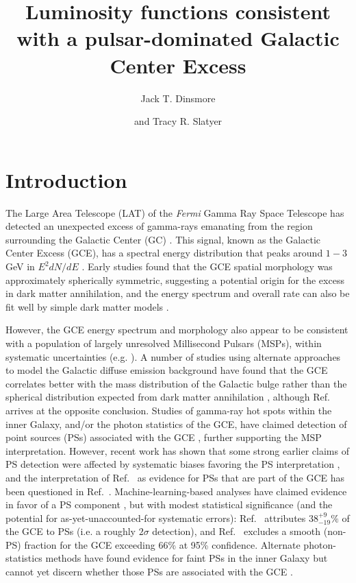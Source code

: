 \documentclass[letter,11pt]{article}
\title{Luminosity functions consistent with a pulsar-dominated Galactic Center Excess}
\author{Jack T. Dinsmore}
\author{and Tracy R. Slatyer}
\affiliation{Center for Theoretical Physics, Massachusetts Institute of Technology, Cambridge, MA 02139, USA}
\begin{document}
\maketitle
\flushbottom

\section{Introduction}

 The Large Area Telescope (LAT) of the \textit{Fermi} Gamma Ray Space Telescope has detected an unexpected excess of gamma-rays emanating from the region surrounding the Galactic Center (GC) \cite{Goodenough:2009gk, HOOPER2011412, Gordon:2013vta}. This signal, known as the Galactic Center Excess (GCE), has a spectral energy distribution that peaks around $1-3$ GeV in $E^2 dN/dE$ 
 \cite{DiMauro:2021raz, Calore:2014xka, Zhong:2019ycb, Gordon13, Ajello:2015kwa, Ajello:2017opo}. Early studies found that the GCE spatial morphology was approximately spherically symmetric, suggesting a potential origin for the excess in dark matter annihilation, and the energy spectrum and overall rate can also be fit well by simple dark matter models \cite{Goodenough:2009gk, Gordon:2013vta, DAYLAN20161, Calore:2014nla, Abazajian:2014fta}.

However, the GCE energy spectrum and morphology also appear to be consistent with a population of largely unresolved Millisecond Pulsars (MSPs), within systematic uncertainties (e.g. \cite{Abazajian:2010zy, Gordon:2013vta, Yuan:2014rca, Calore:2014xka, Petrovic:2014xra}). A number of studies using alternate approaches to model the Galactic diffuse emission background have found that the GCE correlates better with the mass distribution of the Galactic bulge rather than the spherical distribution expected from dark matter annihilation \cite{Macias:2016nev, Bartels:2017vsx, Macias:2019omb, Abazajian:2020tww, Coleman:2019kax}, although Ref.~\cite{DiMauro:2021raz} arrives at the opposite conclusion. Studies of gamma-ray hot spots within the inner Galaxy, and/or the photon statistics of the GCE, have claimed detection of point sources (PSs) associated with the GCE \cite{Bartels:2015aea, Lee:2014mza, Lee:2015fea, Zhong:2019ycb, Buschmann:2020adf}, further supporting the MSP interpretation. However, recent work has shown that some strong earlier claims of PS detection were affected by systematic biases favoring the PS interpretation \cite{Leane:2019xiy, Leane:2020pfc, Leane:2020nmi, Collin:2021ufc}, and the interpretation of Ref.~\cite{Bartels:2015aea} as evidence for PSs that are part of the GCE has been questioned in Ref.~\cite{Zhong:2019ycb}. Machine-learning-based analyses have claimed evidence in favor of a PS component \cite{Caron:2017udl, List:2020mzd, List:2021aer, Mishra-Sharma:2021oxe}, but with modest statistical significance (and the potential for as-yet-unaccounted-for systematic errors): Ref.~\cite{Mishra-Sharma:2021oxe} attributes $38^{+9}_{-19}\%$ of the GCE to PSs (i.e. a roughly $2\sigma$ detection), and Ref.~\cite{List:2021aer} excludes a smooth (non-PS) fraction for the GCE exceeding 66\% at 95\% confidence. Alternate photon-statistics methods have found evidence for faint PSs in the inner Galaxy but cannot yet discern whether those PSs are associated with the GCE \cite{Calore:2021bty}.
\end{document}
